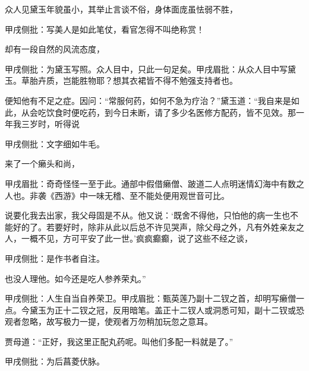 \begin{parag}
    众人见黛玉年貌虽小，其举止言谈不俗，身体面庞虽怯弱不胜，\begin{note}甲戌侧批：写美人是如此笔仗，看官怎得不叫绝称赏！\end{note}却有一段自然的风流态度，\begin{note}甲戌侧批：为黛玉写照。众人目中，只此一句足矣。甲戌眉批：从众人目中写黛玉。草胎卉质，岂能胜物耶？想其衣裙皆不得不勉强支持者也。\end{note}便知他有不足之症。因问：“常服何药，如何不急为疗治？”黛玉道：“我自来是如此，从会吃饮食时便吃药，到今日未断，请了多少名医修方配药，皆不见效。那一年我三岁时，听得说\begin{note}甲戌侧批：文字细如牛毛。\end{note}来了一个癞头和尚，\begin{note}甲戌眉批：奇奇怪怪一至于此。通部中假借癞僧、跛道二人点明迷情幻海中有数之人也。非袭《西游》中一味无稽、至不能处便用观世音可比。\end{note}说要化我去出家，我父母固是不从。他又说：‘既舍不得他，只怕他的病一生也不能好的了。若要好时，除非从此以后总不许见哭声，除父母之外，凡有外姓亲友之人，一概不见，方可平安了此一世。’疯疯癫癫，说了这些不经之谈，\begin{note}甲戌侧批：是作书者自注。\end{note}也没人理他。如今还是吃人参养荣丸。”\begin{note}甲戌侧批：人生自当自养荣卫。甲戌眉批：甄英莲乃副十二钗之首，却明写癞僧一点。今黛玉为正十二钗之冠，反用暗笔。盖正十二钗人或洞悉可知，副十二钗或恐观者忽略，故写极力一提，使观者万勿稍加玩忽之意耳。\end{note}贾母道：“正好，我这里正配丸药呢。叫他们多配一料就是了。”\begin{note}甲戌侧批：为后菖菱伏脉。\end{note}
\end{parag}


